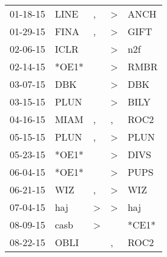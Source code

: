 \begin{supertabular}{p{0.07\textwidth}p{0.06\textwidth}p{0.02\textwidth}p{0.02\textwidth}p{0.06\textwidth}}
          01-18-15\textsuperscript{} &           LINE\textsuperscript{} &                , &     \textgreater &           ANCH\textsuperscript{} \\
          01-29-15\textsuperscript{} &           FINA\textsuperscript{} &                , &     \textgreater &           GIFT\textsuperscript{} \\
          02-06-15\textsuperscript{} &           ICLR\textsuperscript{} &                  &     \textgreater &            n2f\textsuperscript{} \\
          02-14-15\textsuperscript{} &                            *OE1* &                  &     \textgreater &           RMBR\textsuperscript{} \\
          03-07-15\textsuperscript{} &            DBK\textsuperscript{} &                  &     \textgreater &            DBK\textsuperscript{} \\
          03-15-15\textsuperscript{} &           PLUN\textsuperscript{} &                  &     \textgreater &           BILY\textsuperscript{} \\
          04-16-15\textsuperscript{} &           MIAM\textsuperscript{} &                , &                , &           ROC2\textsuperscript{} \\
          05-15-15\textsuperscript{} &           PLUN\textsuperscript{} &                , &     \textgreater &           PLUN\textsuperscript{} \\
          05-23-15\textsuperscript{} &                            *OE1* &                  &     \textgreater &           DIVS\textsuperscript{} \\
          06-04-15\textsuperscript{} &                            *OE1* &                  &     \textgreater &           PUPS\textsuperscript{} \\
          06-21-15\textsuperscript{} &            WIZ\textsuperscript{} &                , &     \textgreater &            WIZ\textsuperscript{} \\
          07-04-15\textsuperscript{} &            haj\textsuperscript{} &     \textgreater &     \textgreater &            haj\textsuperscript{} \\
          08-09-15\textsuperscript{} &           casb\textsuperscript{} &     \textgreater &                  &                            *CE1* \\
          08-22-15\textsuperscript{} &           OBLI\textsuperscript{} &                  &                , &           ROC2\textsuperscript{} \\

\end{supertabular}
